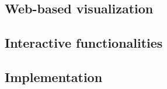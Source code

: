 \subsection{Web-based visualization}

\subsection{Interactive functionalities}








\subsection{Implementation}



